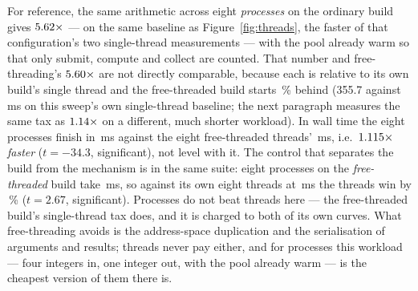 For reference, the same arithmetic across eight \emph{processes} on the ordinary build gives
$\meas{ratio:b4_threads-gil:py_arith/gil/T1_control|b4_threads-gil:py_arith/gil/procs8}{5.62}\times$ --- on the same baseline as Figure~\ref{fig:threads}, the faster of that
configuration's two single-thread measurements --- with the pool already warm so that only
submit, compute and collect are counted. That number and free-threading's $\meas{ratio:b4_threads-ft:py_arith/ft/T1_control|b4_threads-ft:py_arith/ft/T8}{5.60}\times$ are not
directly comparable, because each is relative to its own build's single thread and the
free-threaded build starts \,\% behind (355.7 against \,ms on this sweep's own
single-thread baseline; the next paragraph measures the same tax as $\meas{ratio:b4_threads-ft:single_thread_arith/ft|b4_threads-gil:single_thread_arith/gil}{1.14}\times$ on a different,
much shorter workload). In wall time the eight processes finish in
\,ms against the eight free-threaded threads' \,ms, i.e.\ $\meas{ratio:b4_threads-ft:py_arith/ft/T8|b4_threads-gil:py_arith/gil/procs8}{1.115}\times$
\emph{faster} ($t=-34.3$, significant), not level with it. The control that
separates the build from the mechanism is in the same suite: eight processes on the
\emph{free-threaded} build take \,ms, so against its own eight threads at \,ms the
threads win by \,\% ($t=2.67$, significant). Processes do not beat threads here --- the
free-threaded build's single-thread tax does, and it is charged to both of its own curves. What free-threading avoids is the
address-space duplication and the serialisation of arguments and results; threads never pay
either, and for processes this workload --- four integers in, one integer out, with the pool
already warm --- is the cheapest version of them there is.

